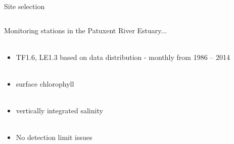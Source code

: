 \documentclass[serif]{beamer}\usepackage[]{graphicx}\usepackage[]{color}
\begin{document}
\begin{frame}{Site selection}
\begin{columns}[T]
\begin{column}{0.45\textwidth}
Monitoring stations in the Patuxent River Estuary... \\~\\
\begin{itemize}
\item TF1.6, LE1.3 based on data distribution - monthly from 1986 -- 2014\\~\\
\item surface chlorophyll  \\~\\
\item vertically integrated salinity \\~\\
\item No detection limit issues
\end{itemize}
\end{column}
\begin{column}{0.45\textwidth}
\centerline{}
\end{column}
\end{columns}
\end{frame}
\end{document}
